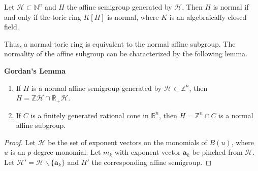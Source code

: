 \documentclass[a0, landscape]{a0poster}
\begin{document}
\begin{multicols}{4}
\begin{itemize}
\begin{theorem*}{\label{Affineiffaffinetoric}}\citep{Ene}
	Let $\mathcal{H} \subset \mathbb{N}^n $ and $H$ the affine semigroup generated by $\mathcal{H}$. Then $H$ is normal if and only if the toric ring $K[H]$ is normal, where $K$ is an algebraically closed field. 
\end{theorem*}

Thus, a normal toric ring is equivalent to the normal affine subgroup. The normality of the affine subgroup can be characterized by the following lemma. 

\columnbreak

\begin{theorem*}\textbf{Gordan's Lemma}\,\citep{Ene}\label{Gordan's Lemma}
\begin{enumerate}
	\item If $H$ is a normal affine semigroup generated by $\mathcal{H} \subset \mathbb{Z}^n$, then $H=\mathbb{Z}\mathcal{H} \cap \mathbb{R}_+ \mathcal{H}$.
	\item If $C$ is a finitely generated rational cone in $\mathbb{R}^n$, then $H=\mathbb{Z}^n \cap C$ is a normal affine subgroup.
\end{enumerate}
\end{theorem*}
\end{itemize} 


\begin{proof}%
Let $\mathcal{H}$ be the set of exponent vectors on the monomials of $B(u)$, where $u$ is an $p$-degree monomial. Let $m_k$ with exponent vector $\mathbf{a}_k$ be pinched from $\mathcal{H}$. Let $\mathcal{H}' = \mathcal{H} \backslash \{\mathbf{a}_k\}$ and $H'$ the corresponding affine semigroup. 
	

\end{proof}
\end{multicols}
\end{document}
